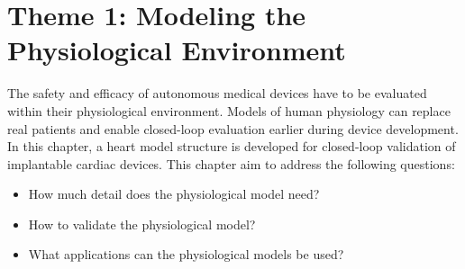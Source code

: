 \chapter{Theme 1: Modeling the Physiological Environment}

The safety and efficacy of autonomous medical devices have to be evaluated within their physiological environment. 
Models of human physiology can replace real patients and enable closed-loop evaluation earlier during device development.
In this chapter, a heart model structure is developed for closed-loop validation of implantable cardiac devices. This chapter aim to address the following questions:
\begin{itemize}
	\item How much detail does the physiological model need?
	\item How to validate the physiological model?
	\item What applications can the physiological models be used?
\end{itemize}





